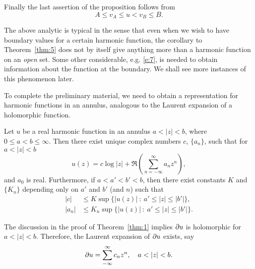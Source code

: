 \documentclass[a4paper,11pt]{article}
\begin{document}
\begin{myproof}
  Finally the last assertion of the proposition follows from
  $$
  A \le v_A \le u < v_B \le B.
  $$
\end{myproof}

\begin{rem}
  The above analytic is typical in the sense that even when we wish to
  have boundary values for a certain harmonic function, the corollary
  to Theorem~\ref{thm:5} does not by itself give anything more than a
  harmonic function on an \emph{open} set.  Some other considerable,
  e.g. \eqref{e:7}, is needed to obtain information about the function
  at the boundary.  We shall see more instances of this phenomenon
  later.
\end{rem}

To complete the preliminary material, we need to obtain a
representation for harmonic functions in an annulus, analogous to the
Laurent expansion of a holomorphic function.

\begin{propn}
  \label{propn:14}
  Let $u$ be a real harmonic function in an annulus $a < |z| < b$,
  where $0 \le a < b \le \infty$.  Then there exist unique complex
  numbers $c$, $\{a_n\}$, such that for $a < |z| < b$
  $$
  u(z) = c\log|z| + \Re(\sum_{n=-\infty}^{\infty} a_n z^n),
  $$
  and $a_0$ is real.  Furthermore, if $a < a' < b' < b$, then there
  exist constants $K$ and $\{K_n\}$ depending only on $a'$ and $b'$
  (and $n$) such that
  $$
  \begin{aligned}
    |c| &\le K \sup\{|u(z)| ~:~ a' \le |z| \le |b'|\},\\
    |a_n| &\le K_n \sup\{|u(z)| ~:~ a' \le |z| \le |b'|\}.
  \end{aligned}
  $$
\end{propn}

\begin{myproof}
  The discussion in the proof of Theorem~\ref{thm:1} implies $\partial u$ is 
  holomorphic for $a < |z| < b$.  Therefore, the Laurent expansion of 
  $\partial u$ exists, say
  $$
  \partial u = \sum_{-\infty}^{\infty} c_n z^n,\quad a < |z| < b.
  $$
\end{myproof}
\end{document}
